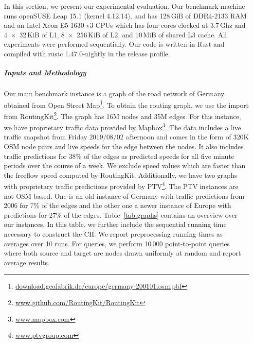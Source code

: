 \documentclass[letterpaper]{article} %
\begin{document}
In this section, we present our experimental evaluation.
Our benchmark machine runs openSUSE Leap 15.1 (kernel 4.12.14), and has 128\,GiB of DDR4-2133 RAM and an Intel Xeon E5-1630 v3 CPUs which has four cores clocked at 3.7\,Ghz and 4~$\times$~32\,KiB of L1, 8~$\times$~256\,KiB of L2, and 10\,MiB of shared L3 cache.
All experiments were performed sequentially.
Our code is written in Rust and compiled with rustc 1.47.0-nightly in the release profile. %

\subparagraph{Inputs and Methodology}
Our main benchmark instance is a graph of the road network of Germany obtained from Open Street Map\footnote{\url{download.geofabrik.de/europe/germany-200101.osm.pbf}}.
To obtain the routing graph, we use the import from RoutingKit\footnote{\url{www.github.com/RoutingKit/RoutingKit}}.
The graph has 16M nodes and 35M edges.
For this instance, we have proprietary traffic data provided by Mapbox\footnote{\url{www.mapbox.com}}.
The  data includes a live traffic snapshot from Friday 2019/08/02 afternoon and comes in the form of 320K OSM node pairs and live speeds for the edge between the nodes.
It also includes traffic predictions for 38\% of the edges as predicted speeds for all five minute periods over the course of a week.
We exclude speed values which are faster than the freeflow speed computed by RoutingKit.
Additionally, we have two graphs with proprietary traffic predictions provided by PTV\footnote{\url{www.ptvgroup.com}}.
The PTV instances are not OSM-based.
One is an old instance of Germany with traffic predictions from 2006 for 7\% of the edges and the other one a newer instance of Europe with predictions for 27\% of the edges.
Table~\ref{tab:graphs} contains an overview over our instances.
In this table, we further include the sequential running time necessary to construct the CH.
We report preprocessing running times as averages over 10 runs.
For queries, we perform 10\,000 point-to-point queries where both source and target are nodes drawn uniformly at random and report average results.
\end{document}
